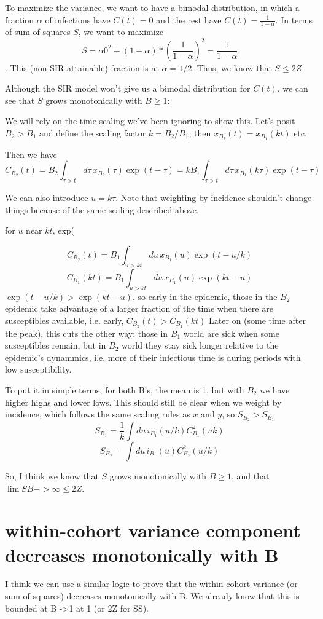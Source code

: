\documentclass[12pt]{article}
\begin{document}
To maximize the variance, we want to have a bimodal distribution, in which a fraction $\alpha$ of infections have $C(t) = 0$ and the rest have $C(t) = \frac{1}{1-\alpha}$.
In terms of sum of squares $S$, we want to maximize
$$ S = \alpha 0^2 + (1-\alpha)*(\frac{1}{1-\alpha})^2 = \frac{1}{1-\alpha}$$.
This (non-SIR-attainable) fraction is at $\alpha = 1/2$.
Thus, we know that $S \leq 2Z$

Although the SIR model won't give us a bimodal distribution for $C(t)$, we can see that $S$ grows monotonically with $B \geq 1$:

We will rely on the time scaling we've been ignoring to show this. Let's posit $B_2>B_1$ and define the scaling factor
$k = B_2/B_1$, then
$x_{B_2}(t) = x_{B_1}(kt)$ etc.

Then we have
$$C_{B_2}(t) = B_2 \int_{\tau>t}{d\tau\, x_{B_2}(\tau) \exp(t-\tau)} = kB_1\int_{\tau>t}{d\tau\, x_{B_1}(k\tau) \exp(t-\tau)}$$


We can also introduce $u = k\tau$. Note that weighting by incidence shouldn't change things because of the same scaling described above.



for $u$ near $kt$, exp(


$$C_{B_2}(t) = B_1 \int_{u>kt}{du\,x_{B_1}(u)\exp(t-u/k)}$$
$$C_{B_1}(kt) = B_1 \int_{u>kt}{du\,x_{B_1}(u)\exp(kt-u)}$$
$\exp(t-u/k) > \exp(kt-u)$, so early in the epidemic, those in the $B_2$ epidemic take advantage of a larger fraction of the time when there are susceptibles available, i.e. early, $C_{B_2}(t)>C_{B_1}(kt)$
Later on (some time after the peak), this cuts the other way: those in $B_1$ world are sick when some susceptibles remain, but in $B_2$ world they stay sick longer relative to the epidemic's dynammics, i.e. more of their infectious time is during periods with low susceptibility.

To put it in simple terms, for both B's, the mean is 1, but with $B_2$ we have higher highs and lower lows.
This should still be clear when we weight by incidence, which follows the same scaling rules as $x$ and $y$, so $S_{B_2}>S_{B_1}$
$$S_{B_1} = \frac{1}{k}\int{du\, i_{B_1}(u/k) C^2_{B_1}(uk)}$$
$$S_{B_2}  = \int{du\, i_{B_1}(u) C^2_{B_2}(u/k)} $$

So, I think we know that $S$ grows monotonically with $B \geq 1$, and that $\lim{S} B-> \infty \leq 2Z$.

\section{within-cohort variance component decreases monotonically with B}
I think we can use a similar logic to prove that the within cohort variance (or sum of squares) decreases monotonically with B. We already know that this is bounded at B ->1 at 1 (or 2Z for SS).
\end{document}
